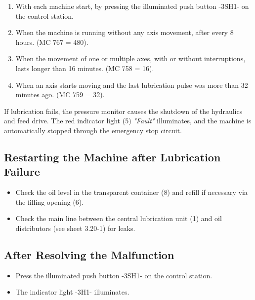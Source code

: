 \begin{enumerate}
    \item With each machine start, by pressing the illuminated push button -3SH1- on the control station.\footnotemark
    \item When the machine is running without any axis movement, after every 8 hours. (MC 767 = 480).
    \item When the movement of one or multiple axes, with or without interruptions, lasts longer than 16 minutes. (MC 758 = 16).
    \item When an axis starts moving and the last lubrication pulse was more than 32 minutes ago. (MC 759 = 32).
\end{enumerate}

If lubrication fails, the pressure monitor causes the shutdown of the hydraulics and feed drive. The red indicator light (5) \textit{"Fault"} illuminates, and the machine is automatically stopped through the emergency stop circuit.

\subsection*{Restarting the Machine after Lubrication Failure}

\begin{itemize}
    \item Check the oil level in the transparent container (8) and refill if necessary via the filling opening (6).\footnotemark
    \item Check the main line between the central lubrication unit (1) and oil distributors (see sheet 3.20-1) for leaks.
\end{itemize}

\subsection*{After Resolving the Malfunction}

\begin{itemize}
    \item Press the illuminated push button -3SH1- on the control station.\footnotemark[1]
    \item The indicator light -3H1- illuminates.
\end{itemize}



